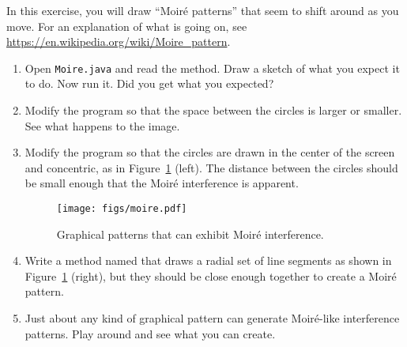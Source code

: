 \begin{exercise}

In this exercise, you will draw ``Moir\'{e} patterns'' that seem to shift around as you move.
For an explanation of what is going on, see \url{https://en.wikipedia.org/wiki/Moire_pattern}.

\begin{enumerate}

\item Open {\tt Moire.java} and read the  method.
Draw a sketch of what you expect it to do.
Now run it.
Did you get what you expected?

\item Modify the program so that the space between the circles is larger or smaller.
See what happens to the image.

\item Modify the program so that the circles are drawn in the center of the screen and concentric, as in Figure~\ref{fig.moire} (left).
The distance between the circles should be small enough that the Moir\'{e} interference is apparent.

\begin{figure}[!ht]
\begin{center}
\texttt{[image: figs/moire.pdf]}
\caption{Graphical patterns that can exhibit Moir\'{e} interference.}
\label{fig.moire}
\end{center}
\end{figure}

\item Write a method named  that draws a radial set of line segments as shown in Figure~\ref{fig.moire} (right), but they should be close enough together to create a Moir\'{e} pattern.

\item Just about any kind of graphical pattern can generate Moir\'{e}-like interference patterns.
Play around and see what you can create.

\end{enumerate}

\end{exercise}
